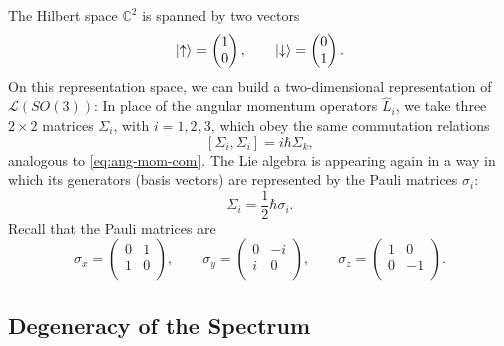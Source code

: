 \begin{example}[$\mathbb{C}^2$]
The Hilbert space $\mathbb{C}^2$ is spanned by two vectors
\begin{equation}
  \ket{\uparrow} =
  \begin{pmatrix}
  1 \\
  0 \\
  \end{pmatrix},
  \qquad
  \ket{\downarrow} =
  \begin{pmatrix}
  0 \\
  1 \\
  \end{pmatrix}.
\end{equation}
  On this representation space, we can build a two-dimensional representation of $\mathscr{L}(SO(3))$: In place of the angular momentum operators $\hat{L}_i$, we take three $2\times 2$ matrices $\Sigma_i$, with $i = 1,2,3$, which obey the same commutation relations 
  \begin{equation}
    \left[ \Sigma_i , \Sigma_i \right] = i \hbar \Sigma_k,
  \end{equation}
  analogous to \eqref{eq:ang-mom-com}.
  The Lie algebra is appearing again in a way in which its generators (basis vectors) are represented by the Pauli matrices $\sigma_i$:
  \begin{equation}
    \Sigma_i = \frac{1}{2} \hbar \sigma_i.
  \end{equation}
  Recall that the Pauli matrices are
  \begin{equation}
    \sigma_x = 
    \begin{pmatrix}
     0 & 1 \\
     1 & 0 \\
    \end{pmatrix},
    \qquad
    \sigma_y = 
    \begin{pmatrix}
     0 & -i \\
     i & 0 \\
    \end{pmatrix},
    \qquad
    \sigma_z = 
    \begin{pmatrix}
     1 & 0 \\
     0 & -1 \\
    \end{pmatrix}.
  \end{equation}
\end{example}

\subsection{Degeneracy of the Spectrum}%
\label{sub:degeneracy_of_the_spectrum}

